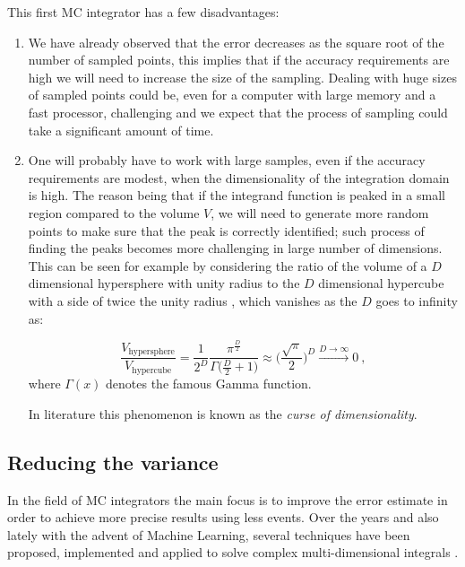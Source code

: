 \documentclass[../main/main.tex]{subfiles}
\begin{document}
This first MC integrator has a few disadvantages:
\begin{enumerate}
\item We have already observed that the error decreases as the square root of the number of sampled points, 
	this implies that if the accuracy requirements are high we will need to increase the size of the sampling. 
	Dealing with huge sizes of sampled points could be, even for a computer with large memory and a fast processor, 
	challenging and we expect that the process of sampling could take a significant amount of time.
	\item One will probably have to work with large samples, even if the accuracy requirements are modest, when
	the dimensionality of the integration domain is high. The reason being that if the integrand function is peaked in a small
	region compared to the volume $V$, we will need to generate more random points to make sure that the peak is correctly 
	identified; such process of finding the peaks becomes more challenging in large number of dimensions.
	This can be seen for example by considering the ratio of the volume of a $D$ dimensional hypersphere with unity radius to the $D$ dimensional hypercube with a side of twice the unity radius , which vanishes as the $D$ goes to infinity as:
	
	\begin{equation}
		\frac{V_{\text{hypersphere}}}{V_{\text{hypercube} }} = \frac{1}{2^D} \frac{\pi^{\frac{D}{2}}}{\Gamma\big(\frac{D}{2} + 1\big)} \approx  \bigg( \frac{\sqrt{\pi}}{2} \bigg)^D \xrightarrow{D \rightarrow  \infty} 0 \ ,
	\end{equation}
	where $\Gamma(x)$ denotes the famous Gamma function.
	
	In literature this phenomenon is known as the \emph{curse of dimensionality}.
\end{enumerate}




\subsection{Reducing the variance}
\label{redu_var}
In the field of MC integrators the main focus is to improve the error estimate in order to achieve more precise results using less events. Over the years and also lately with the advent of Machine Learning, several techniques have been proposed, implemented and applied to solve complex multi-dimensional integrals \cite{Lepage:2020tgj, Carrazza:2020rdn, unknown}.
\end{document}
